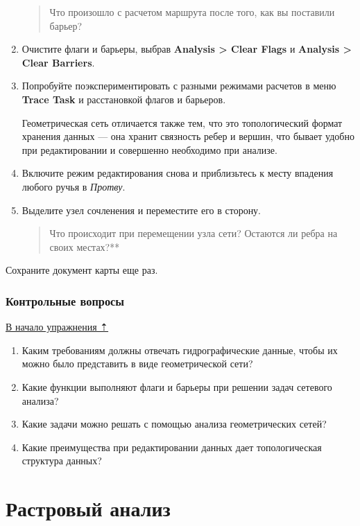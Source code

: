 \documentclass[12pt,]{book}
\begin{document}
\begin{enumerate}
  \begin{quote}
  Что произошло с расчетом маршрута после того, как вы поставили барьер?
  \end{quote}
\item
  Очистите флаги и барьеры, выбрав \textbf{Analysis \textgreater{} Clear Flags} и \textbf{Analysis \textgreater{} Clear Barriers}.
\item
  Попробуйте поэкспериментировать с разными режимами расчетов в меню \textbf{Trace Task} и расстановкой флагов и барьеров.

  Геометрическая сеть отличается также тем, что это топологический формат хранения данных --- она хранит связность ребер и вершин, что бывает удобно при редактировании и совершенно необходимо при анализе.
\item
  Включите режим редактирования снова и приблизьтесь к месту впадения любого ручья в \emph{Протву}.
\item
  Выделите узел сочленения и переместите его в сторону.

  \begin{quote}
  Что происходит при перемещении узла сети? Остаются ли ребра на своих местах?**
  \end{quote}
\end{enumerate}

Сохраните документ карты еще раз.

\hypertarget{network-hydro-questions}{%
\section{Контрольные вопросы}\label{network-hydro-questions}}

\protect\hyperlink{network-hydro}{В начало упражнения ⇡}

\begin{enumerate}
\def\labelenumi{\arabic{enumi}.}
\item
  Каким требованиям должны отвечать гидрографические данные, чтобы их можно было представить в виде геометрической сети?
\item
  Какие функции выполняют флаги и барьеры при решении задач сетевого анализа?
\item
  Какие задачи можно решать с помощью анализа геометрических сетей?
\item
  Какие преимущества при редактировании данных дает топологическая структура данных?
\end{enumerate}

\hypertarget{part---2}{%
\part{Растровый анализ}\label{part---2}}
\end{document}
